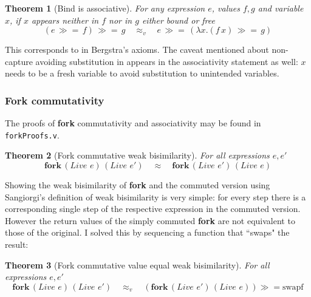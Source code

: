 \documentclass[12pt,twoside,notitlepage]{report}
\theoremstyle{plain}%
\newtheorem{thm}{Theorem}[section]
\theoremstyle{definition}
\theoremstyle{remark}
\begin{document}
\begin{thm}[Bind is associative]
For any expression $ e $, values $ f, g $ and variable $ x $, if $ x $ appears neither in $ f $ nor in $ g $ either bound or free
\[ (e\, \gg=\, f) \, \gg=\, g \quad \approx_v \quad e\, \gg=\, (\lambda x. (f\, x) \, \gg=\, g ) \]
\end{thm}

This corresponds to  in Bergstra's axioms. The caveat mentioned about non-capture avoiding substitution in  appears in the associativity statement as well: $ x $ needs to be a fresh variable to avoid substitution to unintended variables.

\subsubsection{Fork commutativity}
The proofs of \textbf{fork} commutativity and associativity may be found in \verb|forkProofs.v|.

\begin{thm}[Fork commutative weak bisimilarity]
For all expressions $ e, e'$
\[  \textbf{fork}\,(\textit{Live }e)\,(\textit{Live }e')\quad \approx \quad \textbf{fork}\,(\textit{Live }e')\,(\textit{Live }e) \]
\end{thm}

Showing the weak bisimilarity of \textbf{fork} and the commuted version using Sangiorgi's definition of weak bisimilarity is very simple: for every step there is a corresponding single step of the respective expression in the commuted version. However the return values of the simply commuted \textbf{fork} are not equivalent to those of the original. I solved this by sequencing a function that ``swaps" the result:

\begin{thm}[Fork commutative value equal weak bisimilarity]
For all expressions $ e, e'$
\[  \textbf{fork}\,(\textit{Live }e)\,(\textit{Live }e')\quad \approx_v \quad (\textbf{fork}\,(\textit{Live }e')\,(\textit{Live }e))\gg=\text{swapf} \]
\end{thm}
\end{document}
